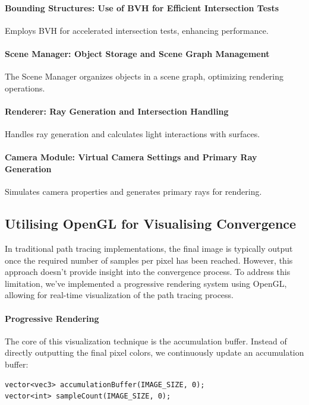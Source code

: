 \documentclass[12pt]{article}
\begin{document}
\paragraph{Bounding Structures: Use of BVH for Efficient Intersection Tests}
Employs BVH for accelerated intersection tests, enhancing performance.

\paragraph{Scene Manager: Object Storage and Scene Graph Management}
The Scene Manager organizes objects in a scene graph, optimizing rendering operations.

\paragraph{Renderer: Ray Generation and Intersection Handling}
Handles ray generation and calculates light interactions with surfaces.

\paragraph{Camera Module: Virtual Camera Settings and Primary Ray Generation}
Simulates camera properties and generates primary rays for rendering.

\subsection{Utilising OpenGL for Visualising Convergence}

In traditional path tracing implementations, the final image is typically output once the required number of samples per pixel has been reached. However, this approach doesn't provide insight into the convergence process. To address this limitation, we've implemented a progressive rendering system using OpenGL, allowing for real-time visualization of the path tracing process.

\paragraph{Progressive Rendering} The core of this visualization technique is the accumulation buffer. Instead of directly outputting the final pixel colors, we continuously update an accumulation buffer:

\begin{verbatim}
vector<vec3> accumulationBuffer(IMAGE_SIZE, 0);
vector<int> sampleCount(IMAGE_SIZE, 0);
\end{verbatim}
\end{document}
